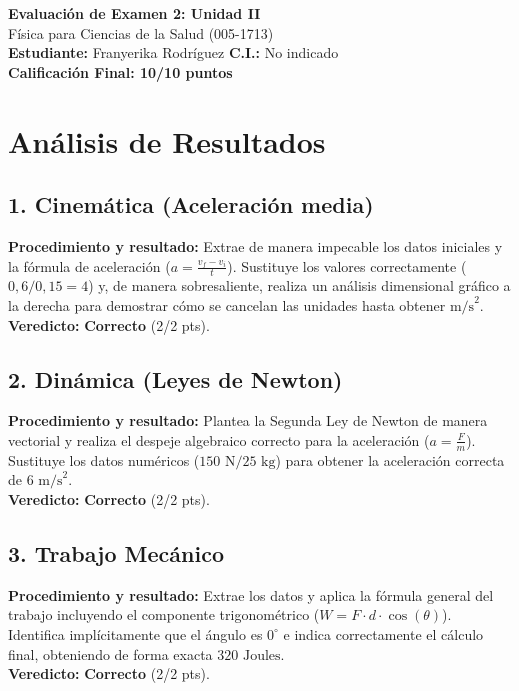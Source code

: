 \documentclass[12pt,letterpaper]{article}
\begin{document}
\begin{center}
    \Large \textbf{Evaluación de Examen 2: Unidad II} \\
    \large Física para Ciencias de la Salud (005-1713) \\
    \vspace{0.5cm}
    \textbf{Estudiante:} Franyerika Rodríguez \quad \textbf{C.I.:} No indicado
    \vspace{0.3cm} \\
    \large \textbf{Calificación Final: 10/10 puntos}
\end{center}

\vspace{0.5cm}

\section*{Análisis de Resultados}

\subsection*{1. Cinemática (Aceleración media)}
\textbf{Procedimiento y resultado:} Extrae de manera impecable los datos iniciales y la fórmula de aceleración ($a = \frac{v_f - v_i}{t}$). Sustituye los valores correctamente ($0,6 / 0,15 = 4$) y, de manera sobresaliente, realiza un análisis dimensional gráfico a la derecha para demostrar cómo se cancelan las unidades hasta obtener $\text{m/s}^2$. \\
\textbf{Veredicto:} \textbf{Correcto} (2/2 pts).

\subsection*{2. Dinámica (Leyes de Newton)}
\textbf{Procedimiento y resultado:} Plantea la Segunda Ley de Newton de manera vectorial y realiza el despeje algebraico correcto para la aceleración ($a = \frac{F}{m}$). Sustituye los datos numéricos ($150 \text{ N} / 25 \text{ kg}$) para obtener la aceleración correcta de $6 \text{ m/s}^2$. \\
\textbf{Veredicto:} \textbf{Correcto} (2/2 pts).

\subsection*{3. Trabajo Mecánico}
\textbf{Procedimiento y resultado:} Extrae los datos y aplica la fórmula general del trabajo incluyendo el componente trigonométrico ($W = F \cdot d \cdot \cos(\theta)$). Identifica implícitamente que el ángulo es $0^\circ$ e indica correctamente el cálculo final, obteniendo de forma exacta $320 \text{ Joules}$. \\
\textbf{Veredicto:} \textbf{Correcto} (2/2 pts).
\end{document}
